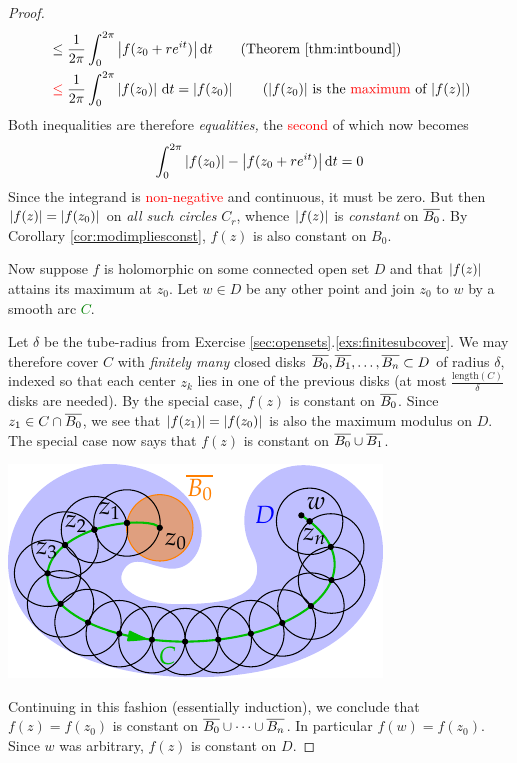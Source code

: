 \begin{proof}
\begin{align*}
		&\le \frac 1{2\pi}\int_0^{2\pi}\nm{f(z_0+r e^{it})}\dt \tag{Theorem \ref{thm:intbound}}\\
		&\mathrel{\textcolor{red}{\le}} \frac 1{2\pi}\int_0^{2\pi}\nm{f(z_0)}\,\dt =\nm{f(z_0)} \tag{$\nm{f(z_0)}$ is the \textcolor{red}{maximum} of $\nm{f(z)}$}
	\end{align*}
	Both inequalities are therefore \emph{equalities,} the \textcolor{red}{second} of which now becomes
	\[
		\int_0^{2\pi}\left| f(z_0)\right|-\left| f(z_0+r e^{it})\right|{\mathrm{d} t}=0
	\]
	Since the integrand is \textcolor{red}{non-negative} and continuous, it must be zero. But then $\left| f(z)\right|=\left| f(z_0)\right|$ on \emph{all such circles} $C_r$, whence $\left| f(z)\right|$ is \emph{constant} on $\overline{B_0}$. By Corollary \ref{cor:modimpliesconst}, $f(z)$ is also constant on $B_0$.\medbreak
	
	Now suppose $f$ is holomorphic on some connected open set $D$ and that $\left| f(z)\right|$ attains its maximum at $z_0$. Let $w\in D$ be any other point and join $z_0$ to $w$ by a smooth arc \textcolor{Green}{$C$}.\par
	\begin{minipage}[t]{0.62\linewidth}\vspace{-2pt}
		Let $\delta$ be the tube-radius from Exercise \ref*{sec:opensets}.\ref{exs:finitesubcover}. We may therefore cover $C$ with \emph{finitely many} closed disks $\overline{B_0},\overline{B_1},\ldots,\overline{B_n}\subset D$ of radius $\delta$, indexed so that each center $z_k$ lies in one of the previous disks (at most $\frac{\text{length}(C)}{\delta}$ disks are needed).\smallbreak
		By the special case, $f(z)$ is constant on $\overline{B_0}$. Since $z_1\in C\cap\overline{B_0}$, we see that $\left| f(z_1)\right|=\left| f(z_0)\right|$ is also the maximum modulus on $D$. The special case now says that $f(z)$ is constant on $\overline{B_0}\cup \overline{B_1}$.
	\end{minipage}
	\hfill
	\begin{minipage}[t]{0.36\linewidth}\vspace{-5pt}
		\flushright\includegraphics[scale=0.95]{maxmod}
	\end{minipage}\medbreak
	Continuing in this fashion (essentially induction), we conclude that $f(z)=f(z_0)$ is constant on $\overline{B_0}\cup\cdots\cup\overline{B_n}$. In particular $f(w)=f(z_0)$. Since $w$ was arbitrary, $f(z)$ is constant on $D$.
\end{proof}


